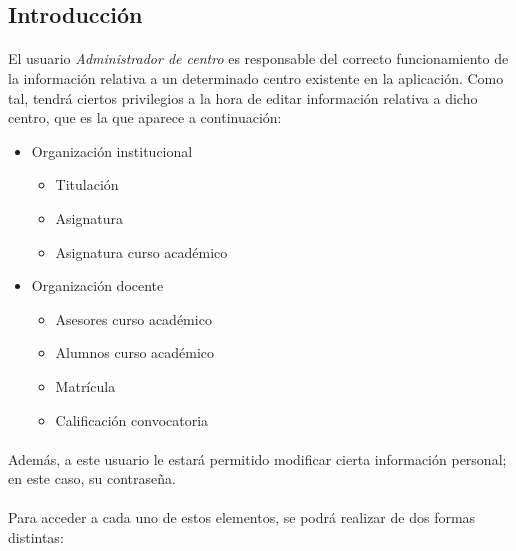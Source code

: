 \subsection{Introducción}

  \paragraph{}El usuario \textit{Administrador de centro} es responsable del
  correcto funcionamiento de la información relativa a un determinado centro
  existente en la aplicación. Como tal, tendrá ciertos privilegios a la hora de
  editar información relativa a dicho centro, que es la que aparece a
  continuación:

  \begin{itemize}
    \item Organización institucional
    \begin{itemize}
      \item Titulación
      \item Asignatura
      \item Asignatura curso académico
    \end{itemize}
   \item Organización docente
   \begin{itemize}
      \item Asesores curso académico
      \item Alumnos curso académico
      \item Matrícula
      \item Calificación convocatoria
   \end{itemize}
  \end{itemize}

  \paragraph{}Además, a este usuario le estará permitido modificar cierta
  información personal; en este caso, su contraseña.

  \paragraph{}Para acceder a cada uno de estos elementos, se podrá realizar de
  dos formas distintas:


